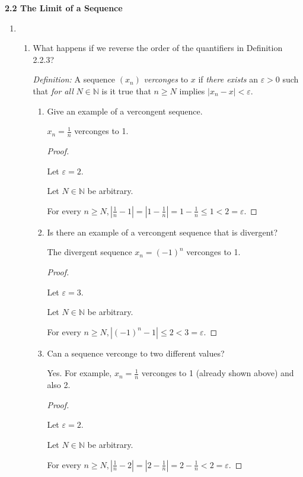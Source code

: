 \documentclass[12pt]{article}
\newcommand{\NN}{\mathbb{N}}
\newcommand\abs[1]{\left| #1 \right|} %
\newcommand{\eps}{\varepsilon}
\begin{document}
\large
\textbf{2.2 The Limit of a Sequence}

\hrulefill

\begin{enumerate}

\item
\begin{enumerate}
\item
What happens if we reverse the order of the quantifiers in Definition 2.2.3?

\textit{Definition:} A sequence $(x_n)$ \textit{verconges} to $x$ if \textit{there exists} an $\eps > 0$ such that \textit{for all} $N \in \NN$ is it true that $n \ge N$ implies $\abs{x_n - x} < \eps$.

\begin{enumerate}
\item Give an example of a vercongent sequence.

$x_n = \frac{1}{n}$ verconges to 1.

\begin{proof}
$ $

Let $\eps = 2$.

Let $N \in \NN$ be arbitrary.

For every $n \ge N, \abs{\frac{1}{n} - 1} = \abs{1 - \frac{1}{n}} = 1 - \frac{1}{n} \le 1 < 2 = \eps$.
\end{proof}

\item Is there an example of a vercongent sequence that is divergent?

The divergent sequence $x_n = (-1)^n$ verconges to 1.

\begin{proof}
$ $

Let $\eps = 3$.

Let $N \in \NN$ be arbitrary.

For every $n \ge N, \abs{(-1)^n - 1} \le 2 < 3 = \eps$.
\end{proof}

\item Can a sequence verconge to two different values?

Yes. For example, $x_n = \frac{1}{n}$ verconges to 1 (already shown above) and also 2.

\begin{proof}
$ $

Let $\eps = 2$.

Let $N \in \NN$ be arbitrary.

For every $n \ge N, \abs{\frac{1}{n} - 2} = \abs{2 - \frac{1}{n}} = 2 - \frac{1}{n} < 2 = \eps$.
\end{proof}


\end{enumerate}
\end{enumerate}
\end{enumerate}
\end{document}
